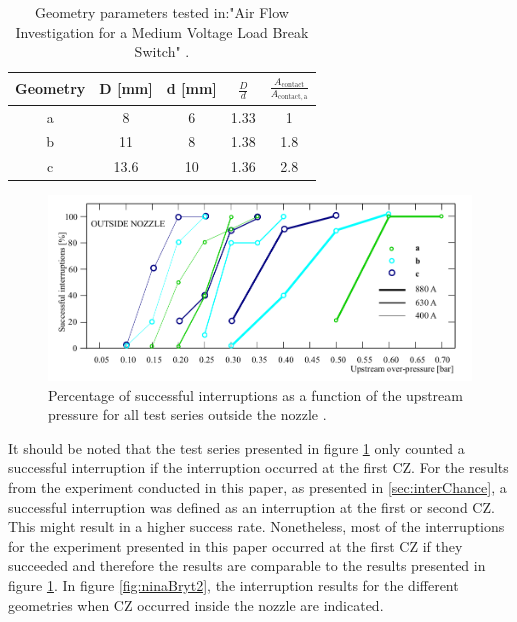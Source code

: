 \documentclass[10pt,a4paper,twoside]{article}
\begin{document}
\begin{table}[H]
\center
\caption{Geometry parameters tested in:"Air Flow Investigation for a Medium Voltage Load Break Switch" \cite{bib:AFIMVLBA}.}
 \begin{tabular}{|c|c|c|c|c|}
\hline 
Geometry & D [mm] & d [mm] & $\frac{D}{d}$ & $\frac{A_\mathrm{{contact}}}{A_\mathrm{{contact,a}}}$ \\ 
\hline 
a & 8 & 6 & 1.33 & 1 \\ 
\hline 
b & 11 & 8 & 1.38 & 1.8 \\ 
\hline 
c & 13.6 & 10 & 1.36 & 2.8 \\ 
\hline 
\end{tabular} 
\label{tab:NinasGeo}
\end{table}

\begin{figure}[H]
  \centering
  \includegraphics[scale=0.4]{Bilder/Discussion/ninaResults.png}
  \caption{Percentage of successful interruptions as a function of the upstream pressure for all test series outside the nozzle \cite{bib:AFIMVLBA}.}
  \label{fig:ninaBryt}
\end{figure}

It should be noted that the test series presented in figure \ref{fig:ninaBryt} only counted a successful interruption if the interruption occurred at the first CZ. For the results from the experiment conducted in this paper, as presented in \ref{sec:interChance}, a successful interruption was defined as an interruption at the first or second CZ. This might result in a higher success rate. Nonetheless, most of the interruptions for the experiment presented in this paper occurred at the first CZ if they succeeded and therefore the results are comparable to the results presented in figure \ref{fig:ninaBryt}. In figure \ref{fig:ninaBryt2}, the interruption results for the different geometries when CZ occurred inside the nozzle are indicated.
\end{document}
